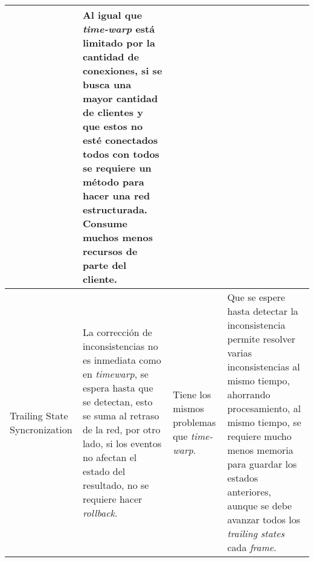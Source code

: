 \begin{longtable}{|p{2cm}|p{4cm}|p{4cm}|p{4cm}|}
&
Al igual que \emph{time-warp} está limitado por la cantidad de conexiones, si se busca una mayor cantidad de clientes y que estos no esté conectados todos con todos se requiere un método para hacer una red estructurada.
\newline Consume muchos menos recursos de parte del cliente.
\\ \hline
Trailing State Syncronization
&
La corrección de inconsistencias no es inmediata como en \emph{timewarp}, se espera hasta que se detectan, esto se suma al retraso de la red, por otro lado, si los eventos no afectan el estado del resultado, no se requiere hacer \emph{rollback}.
&
Tiene los mismos problemas que \emph{time-warp}.
&
Que se espere hasta detectar la inconsistencia permite resolver varias inconsistencias al mismo tiempo, ahorrando procesamiento, al mismo tiempo, se requiere mucho menos memoria para guardar los estados anteriores, aunque se debe avanzar todos los \emph{trailing states} cada \emph{frame}.
\\ \hline
\end{longtable}
\normalsize




